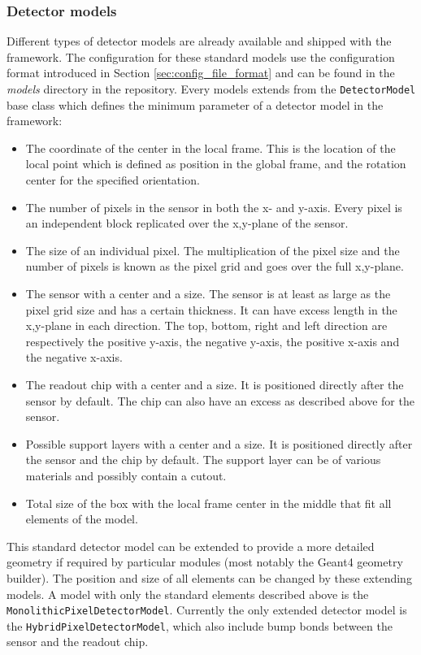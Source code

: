 \subsubsection{Detector models}
\label{sec:detector_models}
Different types of detector models are already available and shipped with the framework. The configuration for these standard models use the configuration format introduced in Section \ref{sec:config_file_format} and can be found in the \textit{models} directory in the repository. Every models extends from the \texttt{DetectorModel} base class which defines the minimum parameter of a detector model in the framework:
\begin{itemize}
\item The coordinate of the center in the local frame. This is the location of the local point which is defined as position in the global frame, and the rotation center for the specified orientation.
\item The number of pixels in the sensor in both the x- and y-axis. Every pixel is an independent block replicated over the x,y-plane of the sensor. 
\item The size of an individual pixel. The multiplication of the pixel size and the number of pixels is known as the pixel grid and goes over the full x,y-plane.
\item The sensor with a center and a size. The sensor is at least as large as the pixel grid size and has a certain thickness. It can have excess length in the x,y-plane in each direction. The top, bottom, right and left direction are respectively the positive y-axis, the negative y-axis, the positive x-axis and the negative x-axis.
\item The readout chip with a center and a size. It is positioned directly after the sensor by default. The chip can also have an excess as described above for the sensor.
\item Possible support layers with a center and a size. It is positioned directly after the sensor and the chip by default. The support layer can be of various materials and possibly contain a cutout.
\item Total size of the box with the local frame center in the middle that fit all elements of the model.
\end{itemize}
This standard detector model can be extended to provide a more detailed geometry if required by particular modules (most notably the Geant4 geometry builder). The position and size of all elements can be changed by these extending models. A model with only the standard elements described above is the \texttt{MonolithicPixelDetectorModel}. Currently the only extended detector model is the \texttt{HybridPixelDetectorModel}, which also include bump bonds between the sensor and the readout chip. 

